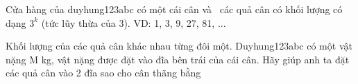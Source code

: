 Cửa hàng của duyhung123abc có một cái cân và  các quả cân có khối lượng có dạng $3^{k}$   (tức lũy thừa của 3). VD: 1, 3, 9, 27, 81, ...  

   Khối lượng của các quả cân khác nhau từng đôi một. Duyhung123abc có một vật nặng M kg, vật nặng được đặt vào đĩa bên trái của cái cân. Hãy giúp anh ta đặt các quả cân vào 2 đĩa sao cho cân thãng bằng